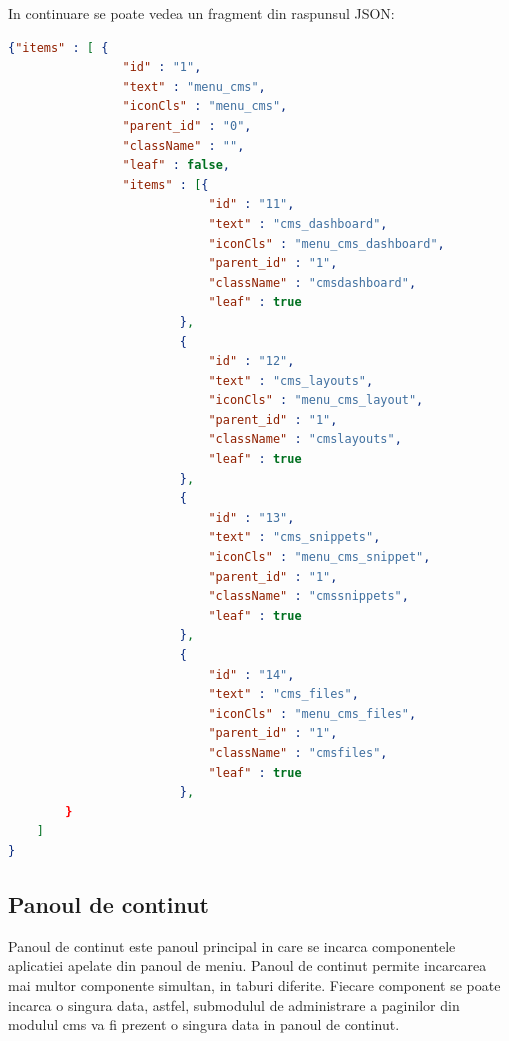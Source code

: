 In continuare se poate vedea un fragment din raspunsul JSON:

\begin{lstlisting}[language=json,firstnumber=1]
{"items" : [ {
                "id" : "1",
                "text" : "menu_cms",
                "iconCls" : "menu_cms",
                "parent_id" : "0",
                "className" : "",
                "leaf" : false,
                "items" : [{
                            "id" : "11",
                            "text" : "cms_dashboard",
                            "iconCls" : "menu_cms_dashboard",
                            "parent_id" : "1",
                            "className" : "cmsdashboard",
                            "leaf" : true
                        },
                        {
                            "id" : "12",
                            "text" : "cms_layouts",
                            "iconCls" : "menu_cms_layout",
                            "parent_id" : "1",
                            "className" : "cmslayouts",
                            "leaf" : true
                        },
                        {
                            "id" : "13",
                            "text" : "cms_snippets",
                            "iconCls" : "menu_cms_snippet",
                            "parent_id" : "1",
                            "className" : "cmssnippets",
                            "leaf" : true
                        },
                        {
                            "id" : "14",
                            "text" : "cms_files",
                            "iconCls" : "menu_cms_files",
                            "parent_id" : "1",
                            "className" : "cmsfiles",
                            "leaf" : true
                        },
		}
	]
}

\end{lstlisting}


\subsection{Panoul de continut}

Panoul de continut este panoul principal in care se incarca componentele aplicatiei apelate din panoul de meniu. Panoul de continut permite incarcarea mai multor componente simultan, in taburi diferite. Fiecare component se poate incarca o singura data, astfel, submodulul de administrare a paginilor din modulul cms va fi prezent o singura data in panoul de continut. 

